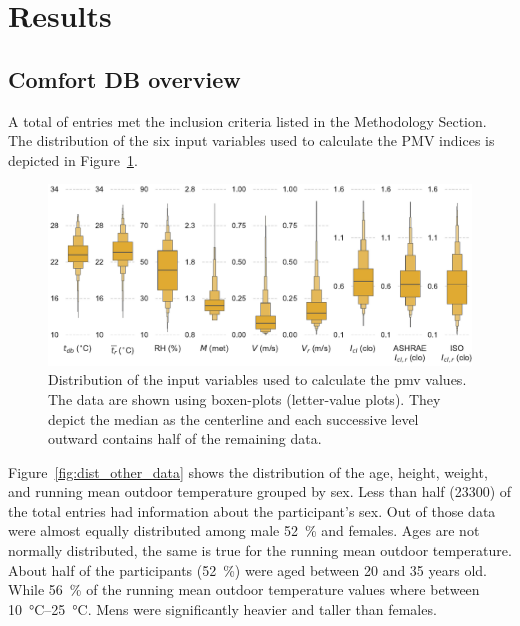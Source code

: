 

\section{Results}\label{sec:results}

\subsection{Comfort DB overview}\label{subsec:comfort-db-overview}

A total of  entries met the inclusion criteria listed in the Methodology Section.
The distribution of the six input variables used to calculate the PMV indices is depicted in Figure~\ref{fig:dist_input_data}.

\begin{figure}
    \centering
    \includegraphics[width=\textwidth]{figures/dist_input_data}
    \caption{Distribution of the input variables used to calculate the \ac{pmv} values.
    The data are shown using boxen-plots (letter-value plots).
    They depict the median as the centerline and each successive level outward contains half of the remaining data.}
    \label{fig:dist_input_data}
\end{figure}

Figure~\ref{fig:dist_other_data} shows the distribution of the age, height, weight, and running mean outdoor temperature grouped by sex.
Less than half (\num{23300}) of the total entries had information about the participant's sex.
Out of those data were almost equally distributed among male \qty{52}{\percent} and females.
Ages are not normally distributed, the same is true for the running mean outdoor temperature.
About half of the participants (\qty{52}{\percent}) were aged between \num{20} and \num{35} years old.
While \qty{56}{\percent} of the running mean outdoor temperature values where between \qtyrange{10}{25}{\celsius}.
Mens were significantly heavier and taller than females.

